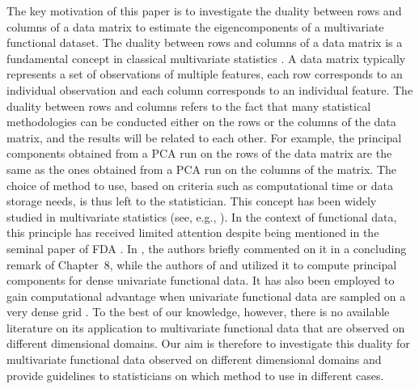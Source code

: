 The key motivation of this paper is to investigate the duality between rows and columns of a data matrix to estimate the eigencomponents of a multivariate functional dataset. The duality between rows and columns of a data matrix is a fundamental concept in classical multivariate statistics \citep{escofierTraitementSimultaneVariables1979,saportaSimultaneousAnalysisQualitative1990}. A data matrix typically represents a set of observations of multiple features, each row corresponds to an individual observation and each column corresponds to an individual feature. The duality between rows and columns refers to the fact that many statistical methodologies can be conducted either on the rows or the columns of the data matrix, and the results will be related to each other. For example, the principal components obtained from a PCA run on the rows of the data matrix are the same as the ones obtained from a PCA run on the columns of the matrix. The choice of method to use, based on criteria such as computational time or data storage needs, is thus left to the statistician. This concept has been widely studied in multivariate statistics (see, e.g., \cite{pagesMultipleFactorAnalysis2014,hardleAppliedMultivariateStatistical2019}). In the context of functional data, this principle has received limited attention despite being mentioned in the seminal paper of FDA \citep{ramsayWhenDataAre1982a}. In \cite{ramsayFunctionalDataAnalysis2005}, the authors briefly commented on it in a concluding remark of Chapter~8, while the authors of \cite{kneipInferenceDensityFamilies2001} and \cite{benkoCommonFunctionalPrincipal2009} utilized it to compute principal components for dense univariate functional data. It has also been employed to gain computational advantage when univariate functional data are sampled on a very dense grid \cite{chenQuantifyingInfiniteDimensionalData2017}. To the best of our knowledge, however, there is no available literature on its application to multivariate functional data that are observed on different dimensional domains. Our aim is therefore to investigate this duality for multivariate functional data observed on different dimensional domains and provide guidelines to statisticians on which method to use in different cases.

